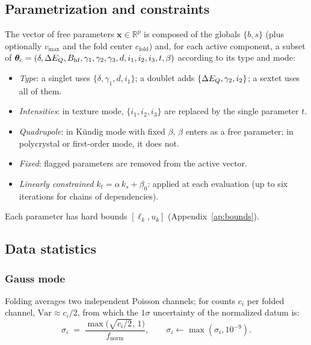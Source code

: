\subsection{Parametrization and constraints}\label{sec:disc-param}

The vector of free parameters $\bm x\in\mathbb R^{p}$ is composed of the globals
$\{b,s\}$ (plus optionally $v_{\max}$ and the fold center $c_{\text{fold}}$) and,
for each active component, a subset of
$\bm\theta_c=(\delta,\Delta E_{Q},B_{\mathrm{hf}},\gamma_1,\gamma_2,\gamma_3,d,i_1,i_2,i_3,t,\beta)$
according to its type and mode:
\begin{itemize}[leftmargin=*]
  \item \emph{Type}: a singlet uses $\{\delta,\gamma_1,d,i_1\}$; a doublet adds
        $\{\Delta E_{Q},\gamma_2,i_2\}$; a sextet uses all of them.
  \item \emph{Intensities}: in texture mode, $\{i_1,i_2,i_3\}$ are replaced by the
        single parameter $t$.
  \item \emph{Quadrupole}: in Kündig mode with fixed $\beta$, $\beta$ enters as a
        free parameter; in polycrystal or first-order mode, it does not.
  \item \emph{Fixed}: flagged parameters are removed from the active vector.
  \item \emph{Linearly constrained} $k_t=\alpha\,k_s+\beta_0$: applied at each
        evaluation (up to six iterations for chains of dependencies).
\end{itemize}
Each parameter has hard bounds $[\ell_k,u_k]$ (Appendix~\ref{ap:bounds}).

\subsection{Data statistics}\label{sec:weighting}

\subsubsection{Gauss mode}
Folding averages two independent Poisson channels; for counts $c_i$ per folded
channel, $\mathrm{Var}\approx c_i/2$, from which the $1\sigma$ uncertainty of the
normalized datum is:
\begin{equation}
  \sigma_i \;=\; \frac{\max\!\bigl(\sqrt{c_i/2},\,1\bigr)}{f_{\text{norm}}},
  \qquad \sigma_i\leftarrow\max(\sigma_i,10^{-9}).
  \label{eq:sigma-gauss}
\end{equation}

